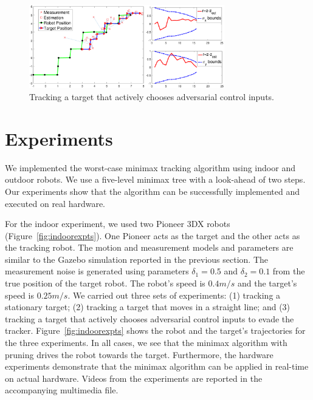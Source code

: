\documentclass[journal]{IEEEtran}
\begin{document}
\begin{figure}
  \centering
  \includegraphics[width=8.5cm]{figs/1_adversary_walk.eps}
  \caption{Tracking a target that actively chooses adversarial control inputs.}
  \label{case3}
\end{figure}


\section{Experiments} 
\label{sec:expt}

We implemented the worst-case minimax tracking algorithm using indoor and outdoor robots. We use a five-level minimax tree with a look-ahead of two steps. Our experiments show that the algorithm can be successfully implemented and executed on real hardware.

For the indoor experiment, we used two Pioneer 3DX robots (Figure~\ref{fig:indoorexpts}). One Pioneer acts as the target and the other acts as the tracking robot. The motion and measurement models and parameters are similar to the Gazebo simulation reported in the previous section. The measurement noise is generated using parameters $\delta_1 = 0.5$ and $\delta_2 = 0.1$ from the true position of the target robot. The robot's speed is $0.4m/s$ and the target's speed is $0.25m/s$. We carried out three sets of experiments: (1) tracking a stationary target; (2) tracking a target that moves in a straight line; and (3) tracking a target that actively chooses adversarial control inputs to evade the tracker. Figure~\ref{fig:indoorexpts} shows the robot and the target's trajectories for the three experiments. In all cases, we see that the minimax algorithm with pruning drives the robot towards the target. Furthermore, the hardware experiments demonstrate that the minimax algorithm can be applied in real-time on actual hardware. Videos from the experiments are reported in the accompanying multimedia file.
\end{document}
